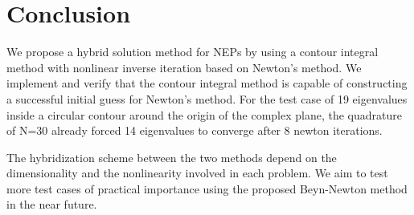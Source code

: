 \documentclass[final,leqno,onefignum,onetabnum]{siamltex1213}
\begin{document}
\section{Conclusion} 
We propose a hybrid solution method for NEPs by using a contour integral method with nonlinear inverse iteration based on Newton's method. We implement and verify that the contour integral method is capable of constructing a successful initial guess for Newton's method. For the test case of 19 eigenvalues inside a circular contour around the origin of the complex plane, the quadrature of N=30 already forced 14 eigenvalues to converge after 8 newton iterations.

The hybridization scheme between the two methods depend on the dimensionality and the nonlinearity involved in each problem. We aim to test more test cases of practical importance using the proposed Beyn-Newton method in the near future. 


%

\end{document}

